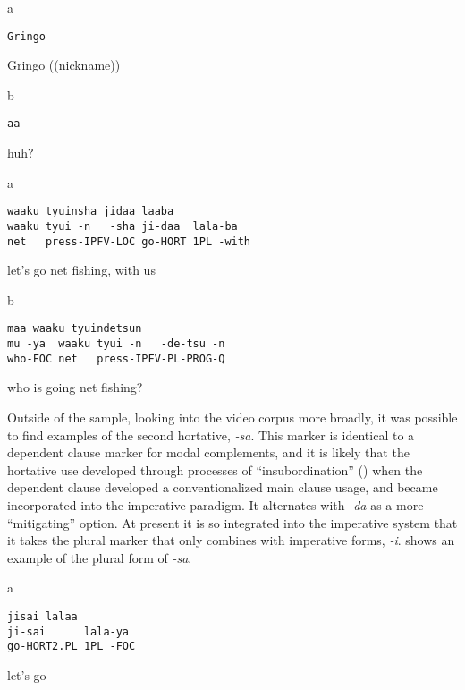 \documentclass[output=paper]{langsci/langscibook}
\begin{document}
\vspace{2mm}
%
\begin{transbox}{1}{a}
\begin{verbatim}
Gringo
\end{verbatim}
Gringo ((nickname))
\end{transbox}
%
\begin{transbox}{2}{b}
\begin{verbatim}
aa
\end{verbatim}
huh?
\end{transbox}
%
\begin{mdframednoverticalspace}[style=firstfoc]
\begin{transbox}{3}{a}
\begin{verbatim}
waaku tyuinsha jidaa laaba
waaku tyui -n   -sha ji-daa  lala-ba
net   press-IPFV-LOC go-HORT 1PL -with
\end{verbatim}
let's go net fishing, with us
\end{transbox}
\end{mdframednoverticalspace}
%
\begin{transbox}{4}{b}
\begin{verbatim}
maa waaku tyuindetsun
mu -ya  waaku tyui -n   -de-tsu -n
who-FOC net   press-IPFV-PL-PROG-Q
\end{verbatim}
who is going net fishing?
\end{transbox}\bigskip

Outside of the sample, looking into the video corpus more broadly, it was possible to find examples of the second hortative, \textit{-sa}. This marker is identical to a dependent clause marker for modal complements, and it is likely that the hortative use developed through processes of “insubordination” (\citealt{Evans2007,Floyd2016,EvansWatanabe2016}) when the dependent clause developed a conventionalized main clause usage, and became incorporated into the imperative paradigm. It alternates with \textit{{}-da} as a more “mitigating” option. At present it is so integrated into the imperative system that it takes the plural marker that only combines with imperative forms, \textit{{}-i}.  shows an example of the plural form of \textit{-sa}.

\vspace{-1mm}
%
\begin{mdframednoverticalspace}[style=firstfoc]
\begin{transbox}{1}{a}
\begin{verbatim}
jisai lalaa
ji-sai      lala-ya
go-HORT2.PL 1PL -FOC
\end{verbatim}
let's go
\end{transbox}
\end{mdframednoverticalspace}
%
\begin{mdframednoverticalspace}[style=secondfoc]
\end{mdframednoverticalspace}
\end{document}
